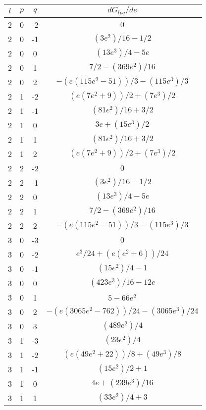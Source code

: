 \begin{table}
\centering
\begin{tabular}{|c|c|c|c|}
\hline
$l$ & $p$ & $q$ & $dG_{lpq}/de$ \\
\hline
2  &  0  &  -2  &  $0$  \\
\hline
2  &  0  &  -1  &  $(3 e^2)/16 - 1/2$  \\
\hline
2  &  0  &  0  &  $(13 e^3)/4 - 5 e$  \\
\hline
2  &  0  &  1  &  $7/2 - (369 e^2)/16$  \\
\hline
2  &  0  &  2  &  $- (e (115 e^2 - 51))/3 - (115 e^3)/3$  \\
\hline
2  &  1  &  -2  &  $(e (7 e^2 + 9))/2 + (7 e^3)/2$  \\
\hline
2  &  1  &  -1  &  $(81 e^2)/16 + 3/2$  \\
\hline
2  &  1  &  0  &  $3 e + (15 e^3)/2$  \\
\hline
2  &  1  &  1  &  $(81 e^2)/16 + 3/2$  \\
\hline
2  &  1  &  2  &  $(e (7 e^2 + 9))/2 + (7 e^3)/2$  \\
\hline
2  &  2  &  -2  &  $0$  \\
\hline
2  &  2  &  -1  &  $(3 e^2)/16 - 1/2$  \\
\hline
2  &  2  &  0  &  $(13 e^3)/4 - 5 e$  \\
\hline
2  &  2  &  1  &  $7/2 - (369 e^2)/16$  \\
\hline
2  &  2  &  2  &  $- (e (115 e^2 - 51))/3 - (115 e^3)/3$  \\
\hline
3  &  0  &  -3  &  $0$  \\
\hline
3  &  0  &  -2  &  $e^3/24 + (e (e^2 + 6))/24$  \\
\hline
3  &  0  &  -1  &  $(15 e^2)/4 - 1$  \\
\hline
3  &  0  &  0  &  $(423 e^3)/16 - 12 e$  \\
\hline
3  &  0  &  1  &  $5 - 66 e^2$  \\
\hline
3  &  0  &  2  &  $- (e (3065 e^2 - 762))/24 - (3065 e^3)/24$  \\
\hline
3  &  0  &  3  &  $(489 e^2)/4$  \\
\hline
3  &  1  &  -3  &  $(23 e^2)/4$  \\
\hline
3  &  1  &  -2  &  $(e (49 e^2 + 22))/8 + (49 e^3)/8$  \\
\hline
3  &  1  &  -1  &  $(15 e^2)/2 + 1$  \\
\hline
3  &  1  &  0  &  $4 e + (239 e^3)/16$  \\
\hline
3  &  1  &  1  &  $(33 e^2)/4 + 3$  \\

\end{tabular}
\end{table}
